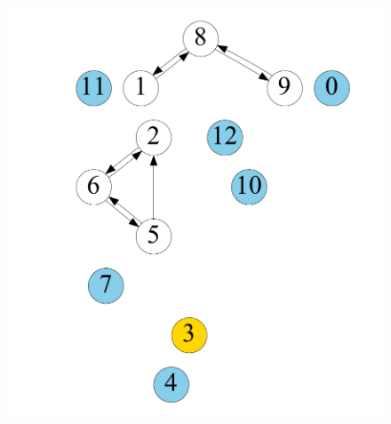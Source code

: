 \begin{figure}[t]
\begin{minipage}[b]{0.19\linewidth}
    \end{minipage}
    \begin{minipage}[b]{0.19\linewidth}
            \centering
                        {\includegraphics[width=\textwidth]{./alg_fig/scc-g3}}
        \end{minipage}
    \begin{minipage}[b]{0.19\linewidth}
            \centering

\end{minipage}
\end{figure}
